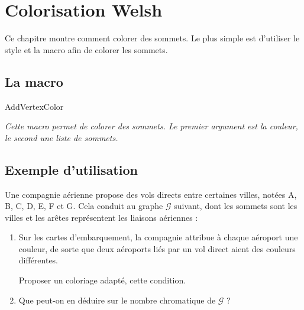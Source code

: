 \section{Colorisation Welsh} 
Ce chapitre montre comment colorer des sommets. Le plus simple est d'utiliser le style  et la macro  afin de colorer les sommets.

\subsection{La macro  } 

\begin{NewMacroBox}{AddVertexColor}{}

\medskip
\emph{Cette macro permet de colorer des sommets. Le premier argument est la couleur, le second une liste  de sommets.}
\end{NewMacroBox} 


\subsection{Exemple d'utilisation } 

\medskip
Une compagnie aérienne propose des vols directs entre certaines villes, notées A, B, C, D, E, F et G. Cela conduit au graphe $\mathcal{G}$ suivant, dont les sommets sont les villes et les arêtes représentent les liaisons aériennes :
 
 \begin{center}
\end{center}

\begin{enumerate}

\item Sur les cartes d'embarquement, la compagnie attribue à chaque aéroport une couleur, de sorte que deux aéroports liés par un vol direct aient des couleurs différentes.

 Proposer un coloriage adapté‚ cette condition.
\item Que peut-on en déduire sur le nombre chromatique de $\mathcal{G}$ ?
\end{enumerate}



